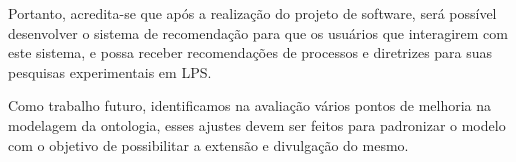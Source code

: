 Portanto, acredita-se que após a realização do projeto de software, será possível desenvolver o sistema de recomendação para que os usuários que interagirem com este sistema, e possa receber recomendações de processos e diretrizes para suas pesquisas experimentais em LPS.

Como trabalho futuro, identificamos na avaliação vários pontos de melhoria na modelagem da ontologia, esses ajustes devem ser feitos para padronizar o modelo com o objetivo de possibilitar a extensão e divulgação do mesmo.


